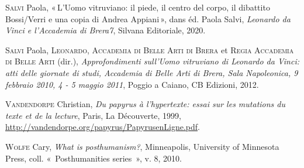 \begin{CSLReferences}{1}{0}
\leavevmode{}%
\textsc{Salvi} Paola, {«\,L'{Uomo} vitruviano: il piede, il centro del
corpo, il dibattito {Bossi}/{Verri} e una copia di {Andrea}
{Appiani}\,»}, dans éd. Paola Salvi, \emph{Leonardo da {Vinci} e
l'{Accademia} di {Brera7}}, Silvana Editoriale, 2020.

\leavevmode{}%
\textsc{Salvi} Paola, \textsc{Leonardo}, \textsc{Accademia di Belle Arti
di Brera} et \textsc{Regia Accademia di Belle Arti} (dir.),
\emph{Approfondimenti sull'{Uomo} vitruviano di {Leonardo} da {Vinci}:
atti delle giornate di studi, {Accademia} di {Belle} {Arti} di {Brera},
{Sala} {Napoleonica}, 9 febbraio 2010, 4 - 5 maggio 2011}, Poggio a
Caiano, CB Edizioni, 2012.

\leavevmode{}%
\textsc{Vandendorpe} Christian, \emph{Du papyrus à l'hypertexte: essai
sur les mutations du texte et de la lecture}, Paris, La Découverte,
1999, \url{http://vandendorpe.org/papyrus/PapyrusenLigne.pdf}.

\leavevmode{}%
\textsc{Wolfe} Cary, \emph{What is posthumanism?}, Minneapolis,
University of Minnesota Press, coll. «~Posthumanities series~», v. 8,
2010.

\end{CSLReferences}
